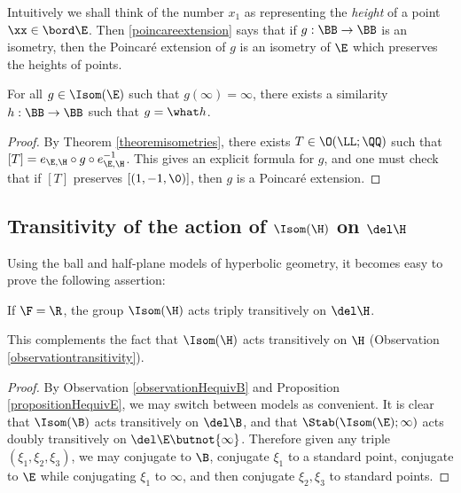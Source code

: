 \begin{remark}
Intuitively we shall think of the number $x_1$ as representing the \emph{height} of a point $\xx\in\bord\E$. Then \eqref{poincareextension} says that if $g:\BB\to\BB$ is an isometry, then the Poincar\'e extension of $g$ is an isometry of $\E$ which preserves the heights of points.
\end{remark}

\begin{proposition}
\label{propositionIsomE}
For all $g\in\Isom(\E)$ such that $g(\infty) = \infty$, there exists a similarity $h:\BB\to\BB$ such that $g = \what h$.
\end{proposition}
\begin{proof}
By Theorem \ref{theoremisometries}, there exists $T\in\O(\LL;\QQ)$ such that $[T] = e_{\E,\H}\circ g\circ e_{\E,\H}^{-1}$. This gives an explicit formula for $g$, and one must check that if $[T]$ preserves $[(1,-1,\0)]$, then $g$ is a Poincar\'e extension.
\end{proof}

\subsection{Transitivity of the action of $\Isom(\H)$ on $\del\H$}
Using the ball and half-plane models of hyperbolic geometry, it becomes easy to prove the following assertion:

\begin{proposition}
\label{propositiontransitivity}
If $\F = \R$, the group $\Isom(\H)$ acts triply transitively on $\del\H$.
\end{proposition}
This complements the fact that $\Isom(\H)$ acts transitively on $\H$ (Observation \ref{observationtransitivity}).
\begin{proof}
By Observation \ref{observationHequivB} and Proposition \ref{propositionHequivE}, we may switch between models as convenient. It is clear that $\Isom(\B)$ acts transitively on $\del\B$, and that $\Stab(\Isom(\E);\infty)$ acts doubly transitively on $\del\E\butnot\{\infty\}$. Therefore given any triple $(\xi_1,\xi_2,\xi_3)$, we may conjugate to $\B$, conjugate $\xi_1$ to a standard point, conjugate to $\E$ while conjugating $\xi_1$ to $\infty$, and then conjugate $\xi_2,\xi_3$ to standard points.
\end{proof}


